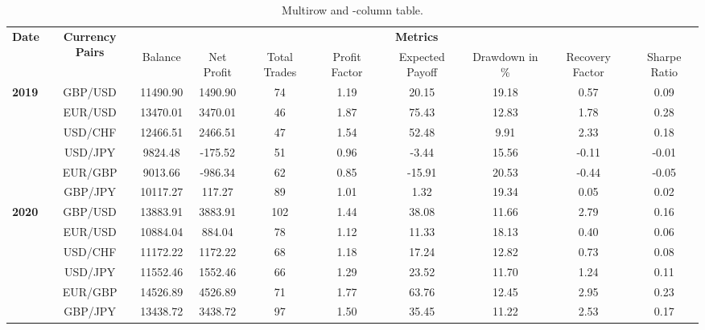 \documentclass[1p]{elsarticle}
\begin{document}
\begin{table}[h!]
  \begin{center}
    \caption{Multirow and -column table.}
    \label{tab:table1}
    \begin{tabular}{p{3cm} c c c c c c c c c}
    \hline
    \multirow{2}{*}{\textbf{Date}} & \multirow{2}{*}{\textbf{Currency Pairs}} &  \multicolumn{8}{c}{\textbf{Metrics}}\\\cline{3-10} %
   
      &  & Balance & Net Profit & Total Trades & Profit Factor & Expected Payoff & Drawdown in \% & Recovery Factor & Sharpe Ratio\\ %
      \hline
       \multirow{6}{*}{\textbf{2019}} & GBP/USD & 11490.90 & {\color{OliveGreen} 1490.90} & 74 & 1.19 & 20.15 & 19.18 & 0.57 & 0.09\\
       & EUR/USD & 13470.01 & {\color{OliveGreen} 3470.01} & 46 & 1.87 & 75.43 & 12.83 & 1.78 & 0.28\\
       & USD/CHF & 12466.51 & {\color{OliveGreen} 2466.51} & 47 & 1.54 & 52.48 & 9.91 & 2.33 & 0.18\\
       & USD/JPY & 9824.48 & {\color{BrickRed} -175.52} & 51 & 0.96 & -3.44 & 15.56 & -0.11 & -0.01\\
       & EUR/GBP & 9013.66 & {\color{BrickRed} -986.34} & 62 & 0.85 & -15.91 & 20.53 & -0.44 & -0.05\\
       & GBP/JPY & 10117.27 & {\color{OliveGreen} 117.27} & 89 & 1.01 & 1.32 & 19.34 & 0.05 & 0.02\\
       \hline

       \multirow{6}{*}{\textbf{2020}} & GBP/USD & 13883.91 & {\color{OliveGreen} 3883.91} & 102 & 1.44 & 38.08 & 11.66 & 2.79 & 0.16\\
       & EUR/USD & 10884.04 & {\color{OliveGreen} 884.04} & 78 & 1.12 & 11.33 & 18.13 & 0.40 & 0.06\\
       & USD/CHF & 11172.22& {\color{OliveGreen} 1172.22} & 68 & 1.18 & 17.24 & 12.82 & 0.73 & 0.08\\
       & USD/JPY & 11552.46 & {\color{OliveGreen} 1552.46} & 66 & 1.29 & 23.52 & 11.70 & 1.24 & 0.11\\
       & EUR/GBP & 14526.89 & {\color{OliveGreen} 4526.89} & 71 & 1.77 & 63.76 & 12.45 & 2.95 & 0.23\\
       & GBP/JPY & 13438.72 & {\color{OliveGreen} 3438.72} & 97 & 1.50 & 35.45 & 11.22 & 2.53 & 0.17\\
       \hline
      

\end{tabular}
\end{center}
\end{table}
\end{document}
